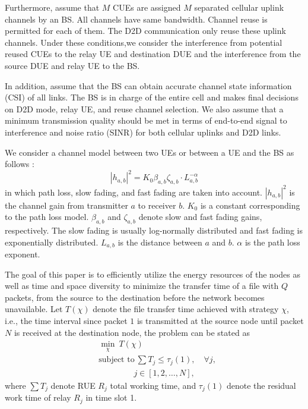 \documentclass[conference]{IEEEtran}
\begin{document}
Furthermore, assume that $M$ CUEs are assigned $M$ separated cellular uplink channels by an BS. All channels have same bandwidth. Channel reuse is permitted for each of them. The D2D communication only reuse these uplink channels. Under these conditions,we consider the interference from potential reused CUEs to the relay UE and destination DUE and the interference from the source DUE and relay UE to the BS.

In addition, assume that the BS can obtain accurate channel state information (CSI) of all links. The BS is in charge of the entire cell and makes final decisions on D2D mode, relay UE, and reuse channel selection. We also assume that a minimum transmission quality should be met in terms of end-to-end signal to interference and noise ratio (SINR) for both cellular uplinks and D2D links.

We consider a channel model between two UEs or between a UE and the BS as follows \cite{6560489} :
\begin{equation}
|{h_{a,b}}|^{2} = K_{0}\beta_{a,b}\zeta_{a,b}\cdot L_{a,b}^{-\alpha}
\end{equation}
in which path loss, slow fading, and fast fading are taken into account. $|{h_{a,b}}|^{2}$ is the channel gain from transmitter $a$ to receiver $b$. $K_{0}$ is a constant corresponding to the path loss model. $\beta_{a,b}$ and $\zeta_{a,b}$ denote slow and fast fading gains, respectively. The slow fading is usually log-normally distributed and fast fading is exponentially distributed. $L_{a,b}$ is the distance between $a$ and $b$. $\alpha$ is the path loss exponent.

The goal of this paper is to efficiently utilize the energy resources of the nodes as well as time and space diversity to minimize the transfer time of a file with $Q$ packets, from the source to the destination before the network becomes unavailable. Let $T\left(\chi\right)$ denote the file transfer time achieved with strategy $\chi$, i.e., the time interval since packet $1$ is transmitted at the source node until packet $N$ is received at the destination node, the problem can be stated as
\begin{align}
&\displaystyle \min _{\mathcal {\chi}} ~T(\mathcal {\chi})
\\[-5pt]&\text {subject to} ~ \sum T_{j} \leq \tau_j(1) , \quad \forall j , \tag{2a}
\\[-1.5pt]&\qquad \qquad ~ j\in\left[1,2,\ldots,N\right] , \tag{2b}
\end{align}
where $\sum T_{j}$ denote RUE $R_{j}$ total working time, and $ \tau_j(1)$ denote the residual work time of relay $R_j$ in time slot 1.
\end{document}
